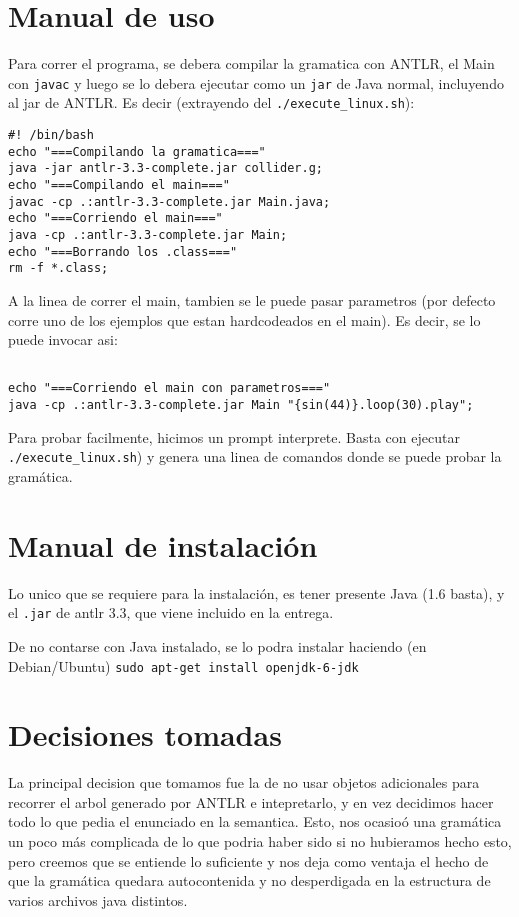 \documentclass[a4paper]{article}
\begin{document}
\section{Manual de uso}
Para correr el programa, se debera compilar la gramatica con ANTLR, el Main con \texttt{javac} y luego
se lo debera ejecutar como un \texttt{jar}  de Java normal, incluyendo al jar de ANTLR. Es decir (extrayendo del
\texttt{./execute\_linux.sh}): 
\begin{verbatim}
#! /bin/bash
echo "===Compilando la gramatica==="
java -jar antlr-3.3-complete.jar collider.g;
echo "===Compilando el main==="
javac -cp .:antlr-3.3-complete.jar Main.java;
echo "===Corriendo el main==="
java -cp .:antlr-3.3-complete.jar Main;
echo "===Borrando los .class==="
rm -f *.class;
\end{verbatim}
A la linea de correr el main, tambien se le puede pasar parametros (por 
defecto corre uno de los ejemplos que estan hardcodeados en el main). 
Es decir, se lo puede invocar asi:
\begin{verbatim}

echo "===Corriendo el main con parametros==="
java -cp .:antlr-3.3-complete.jar Main "{sin(44)}.loop(30).play";
\end{verbatim}

Para probar facilmente, hicimos un prompt interprete. Basta con ejecutar
\texttt{./execute\_linux.sh}) y genera una linea de comandos donde se puede probar la gram\'atica.

\section{Manual de instalaci\'on}
Lo unico que se requiere para la instalaci\'on, es tener presente Java (1.6 basta),
y el \texttt{.jar} de antlr 3.3, que viene incluido en la entrega.

De no contarse con Java instalado, se lo podra instalar haciendo (en Debian/Ubuntu)
\hbox{\texttt{sudo apt-get install openjdk-6-jdk }}

\section{Decisiones tomadas}
La principal decision que tomamos fue la de no usar objetos adicionales para
recorrer el arbol generado por ANTLR e intepretarlo, y en vez decidimos hacer
todo lo que pedia el enunciado en la semantica. Esto, nos ocasio\'o una gram\'atica
un poco m\'as complicada de lo que podria haber sido si no hubieramos hecho esto,
pero creemos que se entiende lo suficiente y nos deja como ventaja el hecho
de que la gram\'atica quedara autocontenida y no desperdigada en la estructura
de varios archivos java distintos.
\end{document}
